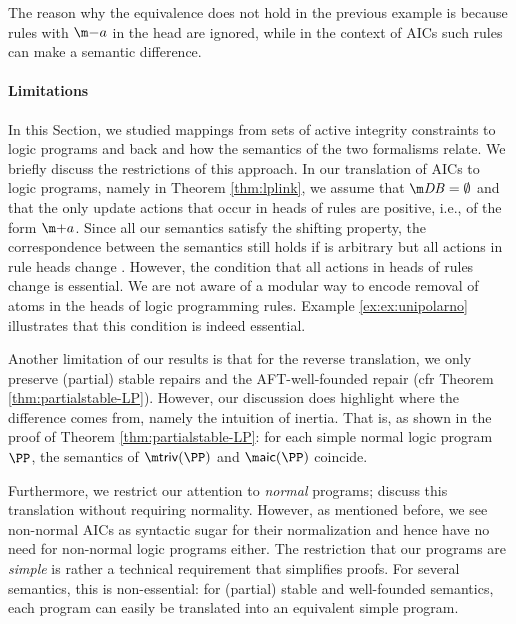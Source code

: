 The reason why the equivalence does not hold in the previous example is because rules with $\remove a$ in the head are ignored, while in the context of AICs such rules can make a semantic difference. 

\paragraph{Limitations}
In this Section, we studied mappings from sets of active integrity constraints to logic programs and back and how the semantics of the two formalisms relate. 
We briefly discuss the restrictions of this approach. 
In our translation of AICs to logic programs, namely in Theorem \ref{thm:lplink}, we assume that $\db=\emptyset$ and that the only update actions that occur in heads of rules are positive, i.e., of the form $\add a$. 
Since all our semantics satisfy the shifting property, the correspondence between the semantics still holds if \db is arbitrary but all actions in rule heads change \db. 
However, the condition that all actions in heads of rules change \db is essential. We are not aware of a modular way to encode removal of atoms in the heads of logic programming rules. 
Example \ref{ex:ex:unipolarno} illustrates that this condition is indeed essential. 

Another limitation of our results is that for the reverse translation, we only preserve (partial) stable repairs and the AFT-well-founded repair (cfr Theorem \ref{thm:partialstable-LP}). 
However, our discussion does highlight where the difference comes from, namely the intuition of inertia. 
That is, as shown in the proof of Theorem \ref{thm:partialstable-LP}: for each simple normal logic program $\PP$, the semantics of $\triv(\PP)$ and $\aicop(\PP)$ coincide. 

Furthermore, we restrict our attention to \emph{normal} programs; \citet{tplp/CaropreseT11} discuss this translation without requiring normality. However, as mentioned before, we see non-normal AICs as syntactic sugar for their normalization and hence have no need for non-normal logic programs either. 
The restriction that our programs are \emph{simple} is rather a technical requirement that simplifies proofs. For several semantics, this is non-essential: for (partial) stable and well-founded semantics, each program can easily be translated into an equivalent simple program.  

